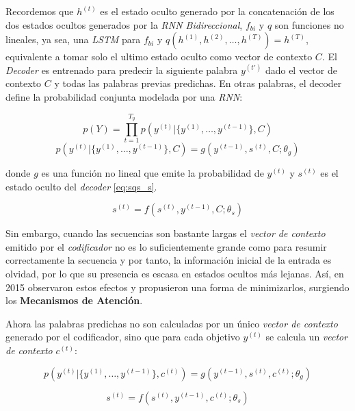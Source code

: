 Recordemos que $h^{(t)}$ es el estado oculto generado por la concatenación de los dos estados ocultos
generados por la \textit{RNN Bidireccional}, $f_{bi}$ y $q$ son funciones no lineales, ya sea,
una \textit{LSTM} para $f_{bi}$ y $q({h^{(1)}, h^{(2)}, \dots, h^{(T)}}) = h^{(T)}$, equivalente a
tomar solo el ultimo estado oculto como vector de contexto $C$. El \textit{Decoder} es entrenado
para predecir la siguiente palabra $y^{(t')}$ dado el vector de contexto $C$ y todas las palabras
previas predichas. En otras palabras, el decoder define la probabilidad conjunta modelada por una
\textit{RNN}:

\begin{equation}
    p(Y) = \prod_{t=1}^{T_y} p(y^{(t)} | \{y^{(1)}, \dots , y^{(t-1)}\}, C)
\end{equation}
\begin{equation}
    p(y^{(t)} | \{y^{(1)}, \dots , y^{(t-1)}\}, C) = g(y^{(t-1)}, s^{(t)}, C; \theta_g)
\end{equation}

donde $g$ es una función no lineal que emite la probabilidad de $y^{(t)}$ y $s^{(t)}$ es el estado oculto
del \textit{decoder} \ref{eq:sqs_s}.

\begin{equation}
    s^{(t)} = f(s^{(t)}, y^{(t-1)}, C; \theta_s)
    \label{eq:sqs_s}
\end{equation}


Sin embargo, cuando las secuencias son bastante largas el \textit{vector de contexto} emitido por el
\textit{codificador} no es lo suficientemente grande como para resumir correctamente la secuencia y
por tanto, la información inicial de la entrada es olvidad, por lo que su presencia es escasa en estados
ocultos más lejanas. Así, en 2015 \cite[Bahdanau et. al]{bahdanau2016neural} observaron estos efectos y
propusieron una forma de minimizarlos, surgiendo los \textbf{Mecanismos de Atención}.

Ahora las palabras predichas no son calculadas por un único \textit{vector de contexto} generado por
el codificador, sino que para cada objetivo $y^{(t)}$ se calcula un \textit{vector de contexto} $c^{(t)}$:

\begin{equation}
    p(y^{(t)} | \{y^{(1)}, \dots , y^{(t-1)}\}, c^{(t)}) = g(y^{(t-1)}, s^{(t)}, c^{(t)}; \theta_g)
\end{equation}

\begin{equation}
    s^{(t)} = f(s^{(t)}, y^{(t-1)}, c^{(t)}; \theta_s)
\end{equation}

